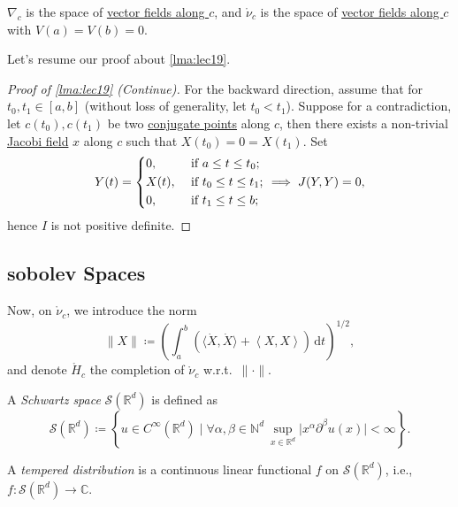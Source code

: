 \begin{prev}
	\(\nabla _c\) is the space of \hyperref[def:vector-field-along-curve]{vector fields along \(c\)}, and \(\mathring{\nu }_c\) is the space of \hyperref[def:vector-field-along-curve]{vector fields along \(c\)} with \(V(a) = V(b) = 0\).
\end{prev}

Let's resume our proof about \autoref{lma:lec19}.

\begin{proof}[Proof of \autoref{lma:lec19} (Continue)]
	For the backward direction, assume that for \(t_0, t_1\in [a, b]\) (without loss of generality, let \(t_0 < t_1\)). Suppose for a contradiction, let \(c(t_0), c(t_1)\) be two \hyperref[def:conjugate-point]{conjugate points} along \(c\), then there exists a non-trivial \hyperref[def:Jacobi-field]{Jacobi field} \(x\) along \(c\) such that \(X(t_0) = 0 = X(t_1)\). Set
	\[
		Y(t) = \begin{dcases}
			0,    & \text{ if } a \leq t \leq t_0 ;   \\
			X(t), & \text{ if } t_0 \leq t \leq t_1 ; \\
			0,    & \text{ if } t_1 \leq t \leq b;
		\end{dcases} \implies J(Y, Y) = 0,
	\]
	hence \(I\) is not positive definite.
\end{proof}

\subsection{sobolev Spaces}
Now, on \(\mathring{\nu }_c\), we introduce the norm
\[
	\lVert X \rVert \coloneqq \left( \int_{a}^{b} \left( \langle \dot{X} , \dot{X} \rangle + \left\langle X, X \right\rangle  \right)  \,\mathrm{d}t \right) ^{1 / 2},
\]
and denote \(\mathring{H}_c\) the completion of \(\mathring{\nu}_c\) w.r.t.\ \(\lVert \cdot \rVert \).

\begin{definition}\label{def:Schwartz-space}
	A \emph{Schwartz space} \(\mathcal{S} (\mathbb{R} ^d)\) is defined as
	\[
		\mathcal{S} (\mathbb{R} ^d) \coloneqq \left\{ u\in C^{\infty} (\mathbb{R} ^d) \mid \forall \alpha , \beta \in \mathbb{N} ^d\ \sup _{x\in \mathbb{R} ^d} \vert x^\alpha \partial ^\beta u(x) \vert < \infty  \right\} .
	\]
\end{definition}

\begin{definition}\label{def:tempered-distribution}
	A \emph{tempered distribution} is a continuous linear functional \(f\) on \(\mathcal{S} (\mathbb{R} ^d)\), i.e., \(f\colon \mathcal{S} (\mathbb{R} ^d) \to \mathbb{C} \).
\end{definition}

